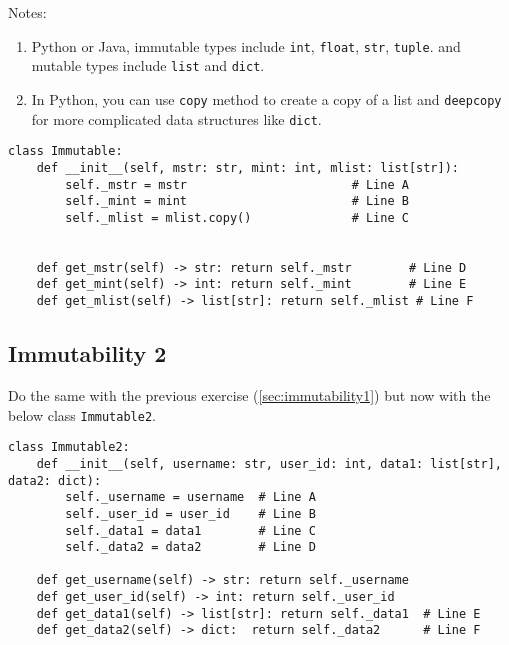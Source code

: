 \documentclass[oneside,11pt,dvipsnames]{book}
\newcommand{\code}[1]{\texttt{#1}}
\begin{document}
Notes:
\begin{enumerate}
\item Python or Java, immutable types include \code{int}, \code{float}, \code{str}, \code{tuple}. and mutable types include \code{list} and \code{dict}. 
\item In Python, you can use \code{copy} method to create a copy of a list and \code{deepcopy} for more complicated data structures like \code{dict}.
\end{enumerate}    

\begin{lstlisting}
class Immutable:
    def __init__(self, mstr: str, mint: int, mlist: list[str]):
        self._mstr = mstr                       # Line A
        self._mint = mint                       # Line B
        self._mlist = mlist.copy()              # Line C

    
    def get_mstr(self) -> str: return self._mstr        # Line D
    def get_mint(self) -> int: return self._mint        # Line E
    def get_mlist(self) -> list[str]: return self._mlist # Line F
\end{lstlisting}


\subsection{Immutability 2}\label{sec:immutability2}
Do the same with the previous exercise (\autoref{sec:immutability1}) but now with the below class \code{Immutable2}.
\begin{lstlisting}
class Immutable2:
    def __init__(self, username: str, user_id: int, data1: list[str], data2: dict):
        self._username = username  # Line A
        self._user_id = user_id    # Line B
        self._data1 = data1        # Line C
        self._data2 = data2        # Line D
        
    def get_username(self) -> str: return self._username
    def get_user_id(self) -> int: return self._user_id
    def get_data1(self) -> list[str]: return self._data1  # Line E
    def get_data2(self) -> dict:  return self._data2      # Line F
\end{lstlisting}


\end{document}
